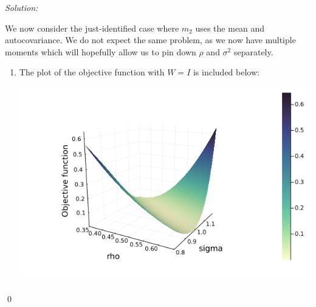 \documentclass[12pt]{article}
\newenvironment{sol}
    {\emph{Solution:}
    }
    {
    \qed
    }
\begin{document}
\begin{sol}
    We now consider the just-identified case where $m_2$ uses the mean and autocovariance. We do not expect the same problem, as we now have multiple moments which will hopefully allow us to pin down $\rho$ and $\sigma^2$ separately.
    \begin{enumerate}[label=\alph*) ]
        \item The plot of the objective function with $W = I$ is included below:
        \begin{center}
            \includegraphics[scale=0.4]{jthplot_2_init.png}
        \end{center}
        

\end{enumerate}
\end{sol}
\end{document}
